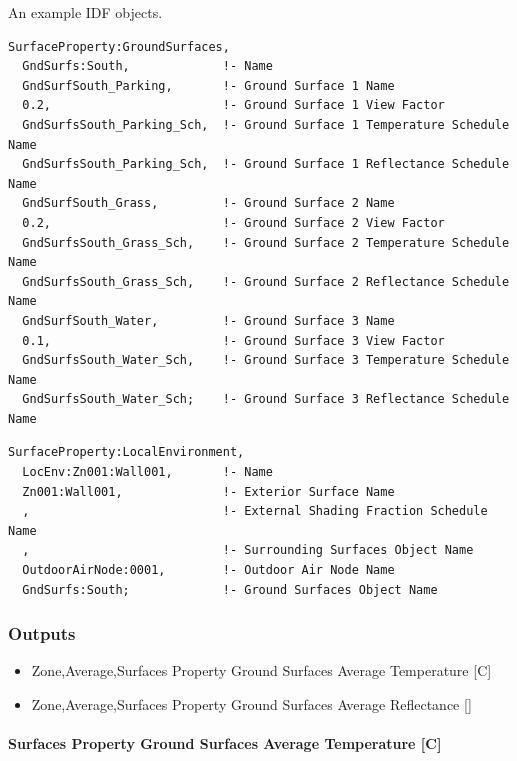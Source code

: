 An example IDF objects.

\begin{lstlisting}
SurfaceProperty:GroundSurfaces,
  GndSurfs:South,             !- Name
  GndSurfSouth_Parking,       !- Ground Surface 1 Name
  0.2,                        !- Ground Surface 1 View Factor
  GndSurfsSouth_Parking_Sch,  !- Ground Surface 1 Temperature Schedule Name
  GndSurfsSouth_Parking_Sch,  !- Ground Surface 1 Reflectance Schedule Name
  GndSurfSouth_Grass,         !- Ground Surface 2 Name
  0.2,                        !- Ground Surface 2 View Factor
  GndSurfsSouth_Grass_Sch,    !- Ground Surface 2 Temperature Schedule Name
  GndSurfsSouth_Grass_Sch,    !- Ground Surface 2 Reflectance Schedule Name
  GndSurfSouth_Water,         !- Ground Surface 3 Name
  0.1,                        !- Ground Surface 3 View Factor
  GndSurfsSouth_Water_Sch,    !- Ground Surface 3 Temperature Schedule Name
  GndSurfsSouth_Water_Sch;    !- Ground Surface 3 Reflectance Schedule Name
\end{lstlisting}

\begin{lstlisting}
SurfaceProperty:LocalEnvironment,
  LocEnv:Zn001:Wall001,       !- Name
  Zn001:Wall001,              !- Exterior Surface Name
  ,                           !- External Shading Fraction Schedule Name
  ,                           !- Surrounding Surfaces Object Name
  OutdoorAirNode:0001,        !- Outdoor Air Node Name
  GndSurfs:South;             !- Ground Surfaces Object Name
\end{lstlisting}

\subsubsection{Outputs}\label{outputs-gndSrfs}

\begin{itemize}
\item
  Zone,Average,Surfaces Property Ground Surfaces Average Temperature {[}C{]}
\item
  Zone,Average,Surfaces Property Ground Surfaces Average Reflectance {[]}
\end{itemize}

\paragraph{Surfaces Property Ground Surfaces Average Temperature {[}C{]}}\label{surfaces-property-ground-surfaces-average-temperature}

